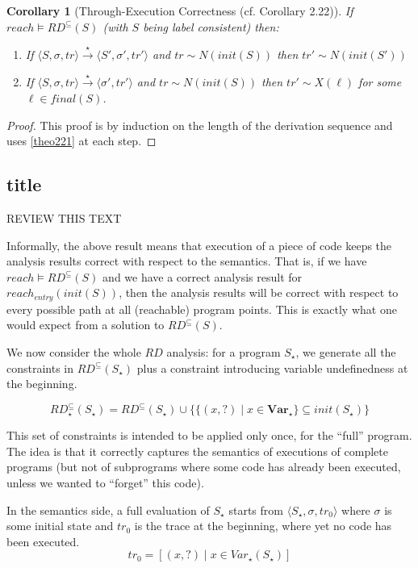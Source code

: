 \documentclass[a4wide,12pt]{article}
\theoremstyle{definition}
\theoremstyle{plain}
\newtheorem{cor}[theo]{Corollary}
\theoremstyle{remark}
\def\const#1{\mathopen{\langle}#1\mathclose{\rangle}} %
\def\pair#1{\const{#1}}
\def\Var {\mathbf{Var}}
\def\starto{\overset{\star}{\to}}
\begin{document}
\begin{cor}[Through-Execution Correctness (cf. Corollary 2.22)]
If $reach \models RD^\subseteq(S)$ (with $S$ being label consistent) then:


\begin{enumerate}
\item If $\pair{S, \sigma, tr} \starto \pair{S', \sigma', tr'}$ and $ tr \sim
N(init(S))$ then $tr' \sim N(init(S'))$
\item If $\pair{S, \sigma, tr} \starto \pair{\sigma', tr'}$ and $ tr \sim
N(init(S))$ then $tr' \sim X(\ell)$ for some $\ell \in final(S)$.
\end{enumerate}
\end{cor}
\begin{proof}
This proof is by induction on the length of the derivation sequence and uses
\ref{theo221} at each step.
\end{proof}

\subsection*{title}

REVIEW THIS TEXT

Informally, the above result means that execution of a piece of code keeps the analysis results correct with respect to the semantics.
That is, if we have $reach \models RD^\subseteq(S)$ and we have a correct analysis result for $reach_{entry}(init(S))$, then the analysis results will
be correct with respect to every possible path at all (reachable) program points. 
This is exactly what one would expect from a solution to $RD^\subseteq(S)$. 

We now consider the whole $RD$ analysis:
for a program $S_\star$, we generate all the constraints in $RD^\subseteq(S_\star)$ plus a constraint
introducing variable undefinedness at the beginning. 
 
\[RD^\subseteq_\star(S_\star) = RD^\subseteq(S_\star) \cup \{ \{(x,?) \mid x \in \Var_\star\} \subseteq init(S_\star) \}\]

This set of constraints is intended to be applied only once, for the ``full'' program.
The idea is that it correctly captures the semantics of executions of complete programs
(but not of subprograms where some code has already been executed, unless we wanted to ``forget''
this code).

In the semantics side, a full evaluation of $S_\star$ starts from $\pair{S_\star,\sigma,tr_0}$
where $\sigma$ is some initial state and $tr_0$ is the trace at the beginning, where yet no code
has been executed.
\[tr_0 = [ (x,?) \mid x \in Var_\star(S_\star) ] \]
\end{document}
